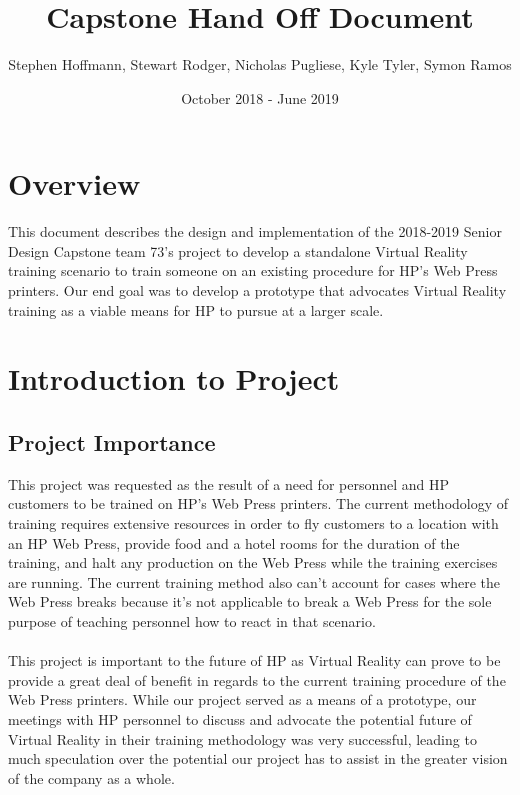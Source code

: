 \documentclass[onecolumn, draftclsnofoot,10pt, compsoc]{IEEEtran}
\title{Capstone Hand Off Document}
\author{Stephen Hoffmann, Stewart Rodger, Nicholas Pugliese, Kyle Tyler, Symon Ramos}
\date{October 2018 - June 2019}
\begin{document}
\setlength\parindent{0pt}
\maketitle

\section*{Overview}
This document describes the design and implementation of the 2018-2019 Senior Design Capstone team 73's project to develop a standalone Virtual Reality training scenario to train someone on an existing procedure for HP's Web Press printers. Our end goal was to develop a prototype that advocates Virtual Reality training as a viable means for HP to pursue at a larger scale.


\tableofcontents

\newpage

\section{Introduction to Project}

\subsection{Project Importance}
This project was requested as the result of a need for personnel and HP customers to be trained on HP's Web Press printers. The current methodology of training requires extensive resources in order to fly customers to a location with an HP Web Press, provide food and a hotel rooms for the duration of the training, and halt any production on the Web Press while the training exercises are running. The current training method also can't account for cases where the Web Press breaks because it's not applicable to break a Web Press for the sole purpose of teaching personnel how to react in that scenario.
\\\\
This project is important to the future of HP as Virtual Reality can prove to be provide a great deal of benefit in regards to the current training procedure of the Web Press printers. While our project served as a means of a prototype, our meetings with HP personnel to discuss and advocate the potential future of Virtual Reality in their training methodology was very successful, leading to much speculation over the potential our project has to assist in the greater vision of the company as a whole. 
\end{document}
